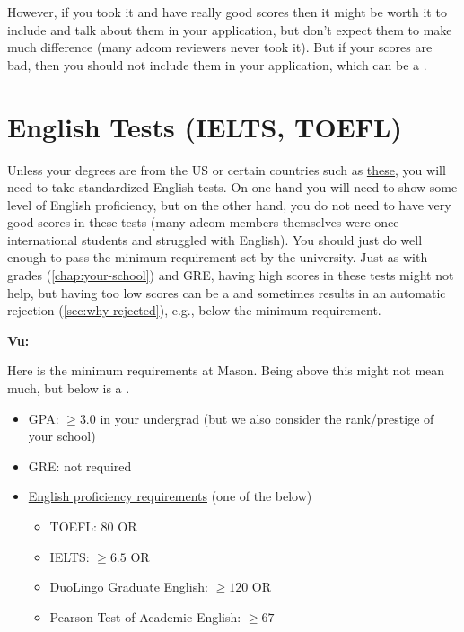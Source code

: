 \documentclass[oneside,11pt,dvipsnames]{book}
\newenvironment{commentbox}[1][]{
  \small
  \begin{mybox}
    {\small \textbf{#1}}
  }{
  \end{mybox}
}
\newcommand{\red}[1]{{\color{red}{#1}}}
\begin{document}
However, if you took it and have really good scores then it might be worth it to include and talk about them in your application, but don't expect them to make much difference (many adcom reviewers never took it). But if your scores are bad, then you should not include them in your application, which can be a \red{red flag}.

\section{English Tests (IELTS, TOEFL)}\label{sec:english-tests} 

Unless your degrees are from the US or certain countries such as \href{https://www.gmu.edu/international/english-language-requirements}{these}, you will need to take standardized English tests. On one hand you will need to show some level of English proficiency, but on the other hand, you do not need to have very good scores in these tests (many adcom members themselves were once international students and struggled with English).
You should just do well enough to pass the minimum requirement set by the university. %
Just as with grades (\autoref{chap:your-school}) and GRE, having high scores in these tests might not help, but having too low scores can be a \red{red flag} and sometimes results in an automatic rejection (\autoref{sec:why-rejected}), e.g., below the minimum requirement.


\begin{commentbox}[Vu:]
  Here is the minimum requirements at Mason. 
  Being above this might not mean much, but below is a \red{red flag}.
  \begin{itemize}
    \item GPA: $\ge 3.0$ in your undergrad (but we also consider the rank/prestige of your school)
    \item GRE: not required 
    \item \href{https://www.gmu.edu/international/english-language-requirements}{English proficiency requirements} (one of the below)
          \begin{itemize}
            \item TOEFL: 80 OR
            \item IELTS: $\ge 6.5$ OR
            \item DuoLingo Graduate English: $\ge 120$ OR
            \item Pearson Test of Academic English: $\ge 67$
          \end{itemize}
  \end{itemize}
\end{commentbox}
\end{document}
